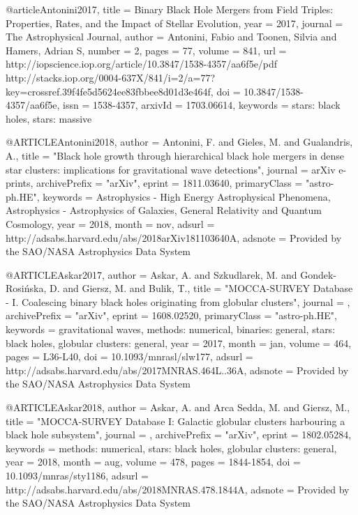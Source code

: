 \documentclass[twocolumn,tighten]{aastex63}
\begin{document}
{{{{{@article{Antonini2017,
    title = {{Binary Black Hole Mergers from Field Triples: Properties, Rates, and the Impact of Stellar Evolution}},
    year = {2017},
    journal = {The Astrophysical Journal},
    author = {Antonini, Fabio and Toonen, Silvia and Hamers, Adrian S},
    number = {2},
    pages = {77},
    volume = {841},
    url = {http://iopscience.iop.org/article/10.3847/1538-4357/aa6f5e/pdf http://stacks.iop.org/0004-637X/841/i=2/a=77?key=crossref.39f4fe5d5624ee83fbbee8d01d3e464f},
    doi = {10.3847/1538-4357/aa6f5e},
    issn = {1538-4357},
    arxivId = {1703.06614},
    keywords = {stars: black holes, stars: massive}
}

@ARTICLE{Antonini2018,
   author = {{Antonini}, F. and {Gieles}, M. and {Gualandris}, A.},
    title = "{Black hole growth through hierarchical black hole mergers in dense star clusters: implications for gravitational wave detections}",
  journal = {arXiv e-prints},
archivePrefix = "arXiv",
   eprint = {1811.03640},
 primaryClass = "astro-ph.HE",
 keywords = {Astrophysics - High Energy Astrophysical Phenomena, Astrophysics - Astrophysics of Galaxies, General Relativity and Quantum Cosmology},
     year = 2018,
    month = nov,
   adsurl = {http://adsabs.harvard.edu/abs/2018arXiv181103640A},
  adsnote = {Provided by the SAO/NASA Astrophysics Data System}
}

@ARTICLE{Askar2017,
   author = {{Askar}, A. and {Szkudlarek}, M. and {Gondek-Rosi{\'n}ska}, D. and 
	{Giersz}, M. and {Bulik}, T.},
    title = "{MOCCA-SURVEY Database - I. Coalescing binary black holes originating from globular clusters}",
  journal = {\mnras},
archivePrefix = "arXiv",
   eprint = {1608.02520},
 primaryClass = "astro-ph.HE",
 keywords = {gravitational waves, methods: numerical, binaries: general, stars: black holes, globular clusters: general},
     year = 2017,
    month = jan,
   volume = 464,
    pages = {L36-L40},
      doi = {10.1093/mnrasl/slw177},
   adsurl = {http://adsabs.harvard.edu/abs/2017MNRAS.464L..36A},
  adsnote = {Provided by the SAO/NASA Astrophysics Data System}
}

@ARTICLE{Askar2018,
   author = {{Askar}, A. and {Arca Sedda}, M. and {Giersz}, M.},
    title = "{MOCCA-SURVEY Database I: Galactic globular clusters harbouring a black hole subsystem}",
  journal = {\mnras},
archivePrefix = "arXiv",
   eprint = {1802.05284},
 keywords = {methods: numerical, stars: black holes, globular clusters: general},
     year = 2018,
    month = aug,
   volume = 478,
    pages = {1844-1854},
      doi = {10.1093/mnras/sty1186},
   adsurl = {http://adsabs.harvard.edu/abs/2018MNRAS.478.1844A},
  adsnote = {Provided by the SAO/NASA Astrophysics Data System}
}

}}}}}
\end{document}

